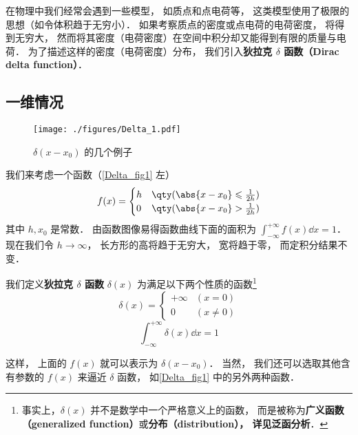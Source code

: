 
\begin{issues}
\issueTODO
\end{issues}

在物理中我们经常会遇到一些模型， 如质点和点电荷等， 这类模型使用了极限的思想（如令体积趋于无穷小）． 如果考察质点的密度或点电荷的电荷密度， 将得到无穷大， 然而将其密度（电荷密度）在空间中积分却又能得到有限的质量与电荷． 为了描述这样的密度（电荷密度）分布， 我们引入\textbf{狄拉克 $\delta$ 函数（Dirac delta function）}．

\subsection{一维情况}

\begin{figure}[ht]
\centering
\texttt{[image: ./figures/Delta\_1.pdf]}
\caption{$\delta(x - x_0)$ 的几个例子} \label{Delta_fig1}
\end{figure}

我们来考虑一个函数（\autoref{Delta_fig1} 左）
\begin{equation}
f(x) =
\begin{cases}
h & \qty( \abs{x - x_0} \leqslant \frac{1}{2h} )\\
0 & \qty( \abs{x - x_0} > \frac{1}{2h} )
\end{cases}
\end{equation}
其中 $h, x_0$ 是常数． 由函数图像易得函数曲线下面的面积为 $\int_{-\infty}^{+\infty} f(x) \dd{x} = 1$． 现在我们令 $h \to \infty$， 长方形的高将趋于无穷大， 宽将趋于零， 而定积分结果不变．

我们定义\textbf{狄拉克 $\delta$ 函数} $\delta(x)$ 为满足以下两个性质的函数\footnote{事实上，$\delta(x)$ 并不是数学中一个严格意义上的函数， 而是被称为\textbf{广义函数（generalized function）}或\textbf{分布（distribution）， 详见泛函分析}．} %
\begin{equation}\label{Delta_eq2}
\delta(x) =
\begin{cases}
+\infty & (x = 0)\\
0 & (x \ne 0)
\end{cases}
\end{equation}
\begin{equation}\label{Delta_eq3}
\int_{-\infty}^{+\infty} \delta(x) \dd{x} = 1
\end{equation}

这样， 上面的 $f(x)$ 就可以表示为 $\delta(x - x_0)$． 当然， 我们还可以选取其他含有参数的 $f(x)$ 来逼近 $\delta$ 函数， 如\autoref{Delta_fig1} 中的另外两种函数．

